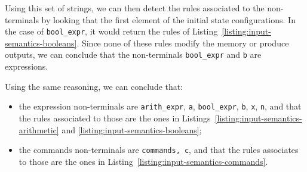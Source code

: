 \documentclass[conference]{IEEEtran}
\begin{document}
Using this set of strings, we can then detect the rules associated to the non-terminals by looking that the first element of the initial state configurations. In the case of \lstinline{bool_expr}, it would return the rules of Listing~\ref{listing:input-semantics-booleans}. Since none of these rules modify the memory or produce outputs, we can conclude that the non-terminals \lstinline{bool_expr} and \lstinline{b} are expressions.

Using the same reasoning, we can conclude that:
\begin{itemize}
	\item the expression non-terminals are \lstinline{arith_expr}, \lstinline{a}, \lstinline{bool_expr}, \lstinline{b}, \lstinline{x}, \lstinline{n}, and that the rules associated to those are the ones in Listings~\ref{listing:input-semantics-arithmetic} and \ref{listing:input-semantics-booleans};
	\item the commands non-terminals are \lstinline{commands, c}, and that the rules associates to those are the ones in Listing~\ref{listing:input-semantics-commands}.
\end{itemize}
\end{document}
